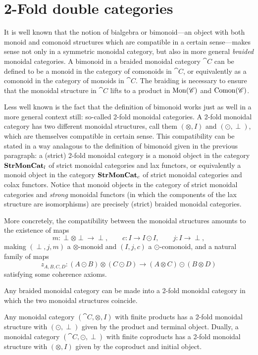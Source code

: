 
\chapter{2-Fold double categories}\label{Ch:2Fold}


It is well known that the notion of bialgebra or bimonoid---an object with both monoid and comonoid structures which are compatible in a certain sense---makes sense not only in a symmetric monoidal category, but also in more general \emph{braided} monoidal categories. A bimonoid in a braided monoidal category $\cat{C}$ can be defined to be a monoid in the category of comonoids in $\cat{C}$, or equivalently as a comonoid in the category of monoids in $\cat{C}$. The braiding is necessary to ensure that the monoidal structure in $\cat{C}$ lifts to a product in $\mathrm{Mon}(\mathscr{C})$ and $\mathrm{Comon}(\mathscr{C})$.

Less well known is the fact that the definition of bimonoid works just as well in a more general context still: so-called 2-fold monoidal categories. A 2-fold monoidal category has two different monoidal structures, call them $(\otimes,I)$ and $(\odot,\perp)$, which are themselves compatible in certain sense. This compatibility can be stated in a way analagous to the definition of bimonoid given in the previous paragraph: a (strict) 2-fold monoidal category is a monoid object in the category $\mathbf{StrMonCat}_l$ of strict monoidal categories and lax functors, or equivalently a monoid object in the category $\mathbf{StrMonCat}_c$ of strict monoidal categories and colax functors. Notice that monoid objects in the category of strict monoidal categories and \emph{strong} monoidal functors (in which the components of the lax structure are isomorphisms) are precisely (strict) braided monoidal categories.

More concretely, the compatibility between the monoidal structures amounts to the existence of maps
\[
	m\colon \perp\otimes\perp\to\perp, \qquad c\colon I\to I\odot I, \qquad j\colon I\to \perp,
\]
making $(\perp,j,m)$ a $\otimes$-monoid and $(I,j,c)$ a $\odot$-comonoid, and a natural family of maps
\[
	z_{A,B,C,D}\colon (A\odot B)\otimes(C\odot D) \to (A\otimes C)\odot(B\otimes D)
\]
satisfying some coherence axioms.

\begin{example}\leavevmode
\begin{compactitem}
	\item Any braided monoidal category can be made into a 2-fold monoidal category in which the two monoidal structures coincide.
	\item Any monoidal category $(\cat{C},\otimes,I)$ with finite products has a 2-fold monoidal structure with $(\odot,\perp)$ given by the product and terminal object. Dually, a monoidal category $(\cat{C},\odot,\perp)$ with finite coproducts has a 2-fold monoidal structure with $(\otimes,I)$ given by the coproduct and initial object.
\end{compactitem}
\end{example}

